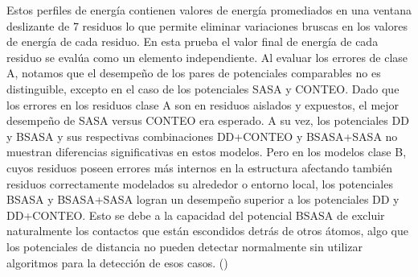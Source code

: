 Estos perfiles de energía contienen valores de energía promediados en una ventana deslizante de 7 residuos lo que permite eliminar variaciones bruscas en los valores de energía de cada residuo.
En esta prueba el valor final de energía de cada residuo se evalúa como un elemento independiente.
Al evaluar los errores de clase A, notamos que el desempeño de los pares de potenciales comparables no es distinguible, excepto en el caso de los potenciales SASA y CONTEO.
Dado que los errores en los residuos clase A son en residuos aislados y expuestos, el mejor desempeño de SASA versus CONTEO era esperado.
A su vez, los potenciales DD y BSASA y sus respectivas combinaciones DD+CONTEO y BSASA+SASA no muestran diferencias significativas en estos modelos.
Pero en los modelos clase B, cuyos residuos poseen errores más internos en la estructura afectando también residuos correctamente modelados su alrededor o entorno local, los potenciales BSASA y BSASA+SASA logran un desempeño superior a los potenciales DD y DD+CONTEO.
Esto se debe a la capacidad del potencial BSASA de excluir naturalmente los contactos que están escondidos detrás de otros átomos, algo que los potenciales de distancia no pueden detectar normalmente sin utilizar algoritmos para la detección de esos casos. (\cite{Ferrada2007,Ferrada2009})

